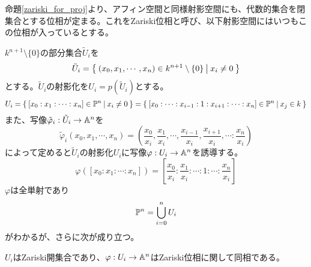 \documentclass{ltjsreport}
\begin{document}
命題\ref{zariski_for_proj}より、アフィン空間と同様射影空間にも、代数的集合を閉集合とする位相が定まる。これをZariski位相と呼び、以下射影空間にはいつもこの位相が入っているとする。

$k^{n+1}\setminus\{0\}$の部分集合$\tilde{U}_i$を
\[
\tilde{U}_i=\left\{\:(x_0,x_1,\cdots,x_n)\in k^{n+1}\setminus\{0\}\:\middle|\:x_i\neq 0\:\right\}  
\]
とする。$\tilde{U}_i$の射影化を$U_i=p(\tilde{U}_i)$とする。
\[
U_i=\left\{\:[x_0:x_1:\cdots:x_n]\in\mathbb{P}^n\:\middle|\:x_i\neq 0\:\right\}=\left\{\:[x_0:\cdots:x_{i-1}:1:x_{i+1}:\cdots:x_n]\in\mathbb{P}^n\:\middle|\:x_j\in k\:\right\} 
\]
また、写像$\tilde{\varphi}_i:\tilde{U}_i\rightarrow \mathbb{A}^n$を
\[
\tilde{\varphi}_i(x_0,x_1,\cdots,x_n)=(\frac{x_0}{x_i},\frac{x_1}{x_i},\cdots,\frac{x_{i-1}}{x_i},\frac{x_{i+1}}{x_i},\cdots:\frac{x_n}{x_i})
\]
によって定めると$\tilde{U}_i$の射影化$U_i$に写像$\varphi:U_i\rightarrow \mathbb{A}^n$を誘導する。
\[
\varphi([x_0:x_1:\cdots:x_n])=[\frac{x_0}{x_i}:\frac{x_1}{x_i}:\cdots:1:\cdots:\frac{x_n}{x_i}] 
\]
$\varphi$は全単射であり
\[
\mathbb{P}^n=\bigcup_{i=0}^nU_i  
\]
がわかるが、さらに次が成り立つ。

\begin{prop}
  $U_i$はZariski開集合であり、$\varphi:U_i\rightarrow \mathbb{A}^n$はZariski位相に関して同相である。
\end{prop}
\end{document}
